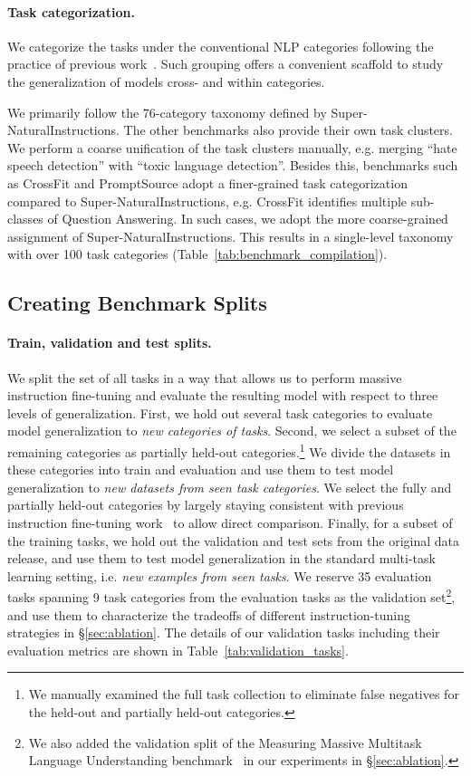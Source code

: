 \paragraph{Task categorization.} 

We categorize the tasks under the conventional NLP categories following the practice of previous work~\citep{wei2021flan,sanh2021t0,wang2022niv2,ye2021crossfit}. Such grouping offers a convenient scaffold to study the generalization of models cross- and within categories.

We primarily follow the 76-category taxonomy defined by Super-NaturalInstructions. The other benchmarks also provide their own task clusters. We perform a coarse unification of the task clusters manually, e.g. merging ``hate speech detection'' with ``toxic language detection''. Besides this, benchmarks such as CrossFit and PromptSource adopt a finer-grained task categorization compared to Super-NaturalInstructions, e.g. CrossFit identifies multiple sub-classes of Question Answering. In such cases, we adopt the more coarse-grained assignment of Super-NaturalInstructions. This results in a single-level taxonomy with over 100 task categories (Table~\ref{tab:benchmark_compilation}). 

\subsection{Creating Benchmark Splits}
\label{sec:evaluation_splits}
\paragraph{Train, validation and test splits.} We split the set of all tasks in a way that allows us to perform massive instruction fine-tuning and evaluate the resulting model with respect to three levels of generalization. First, we hold out several task categories to evaluate model generalization to \emph{new categories of tasks}. Second, we select a subset of the remaining categories as partially held-out categories.\footnote{We manually examined the full task collection to eliminate false negatives for the held-out and partially held-out categories.} We divide the datasets in these categories into train and evaluation and use them to test model generalization to \emph{new datasets from seen task categories}. We select the fully and partially held-out categories by largely staying consistent with previous instruction fine-tuning work~\citep{wang2022niv2,wei2021flan,sanh2021t0} to allow direct comparison. Finally, for a subset of the training tasks, we hold out the validation and test sets from the original data release, and use them to test model generalization in the standard multi-task learning setting, i.e. \emph{new examples from seen tasks}. We reserve 35 evaluation tasks spanning 9 task categories from the evaluation tasks as the validation set\footnote{We also added the validation split of the Measuring Massive Multitask Language Understanding benchmark~\cite{hendryckstest2021mmlu} in our experiments in \S\ref{sec:ablation}.}, and use them to characterize the tradeoffs of different instruction-tuning strategies in \S\ref{sec:ablation}. The details of our validation tasks including their evaluation metrics are shown in Table~\ref{tab:validation_tasks}.

